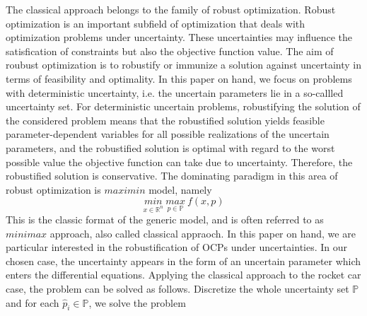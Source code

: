 \documentclass  [
  paper    = a4,
  BCOR     = 10mm,
  twoside,
  fontsize = 12pt,
  fleqn,
  toc      = bibnumbered,
  toc      = listofnumbered,
  numbers  = noendperiod,
  headings = normal,
  listof   = leveldown,
  version  = 3.03
]                                       {scrreprt}
\newcommand{\<}{\langle}
\renewcommand{\>}{\rangle}
\begin{document}
The classical approach belongs to the family of robust optimization.  Robust optimization is an important subfield of optimization that deals with optimization problems under uncertainty. These uncertainties may influence the satisfication of constraints but also the objective function value.  The aim of roubust optimization is to robustify or immunize a solution against uncertainty in terms of feasibility and optimality.  In this paper on hand, we focus on problems with deterministic uncertainty, i.e. the uncertain parameters lie in a so-callled uncertainty set. For deterministic uncertain problems, robustifying the solution of the considered problem means that the robustified solution yields feasible parameter-dependent variables for all possible realizations of the uncertain parameters, and the robustified solution is optimal with regard to the worst possible value the objective function can take due to uncertainty. Therefore, the robustified solution is conservative. The dominating paradigm in this area of robust optimization is $maximin$ model, namely
\begin{equation}
	\underset{x \in \mathbb{R}^n}{min} \   \underset{p \in \mathbb{P}}{max}  \  f(x,p) 
\end{equation}
This is the classic format of the generic model, and is often referred to as $minimax$ approach, also called classical appraoch. 
In this paper on hand, we are particular interested in the robustification of OCPs under uncertainties. In our chosen case, the uncertainty appears in the form of an uncertain parameter which enters the differential equations.  Applying the classical approach to the rocket car case, the problem can be solved as follows. Discretize the whole uncertainty set  $\mathbb{P}$ and for each $ \hat{p}_i \in \mathbb{P}$, we solve the problem
\end{document}
